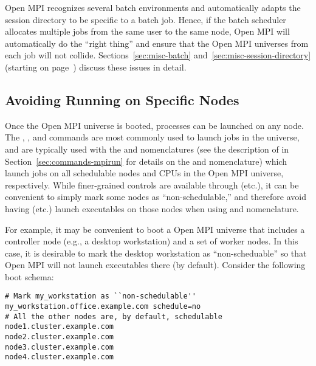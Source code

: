 Open MPI recognizes several batch environments and automatically adapts the
session directory to be specific to a batch job.  Hence, if the batch
scheduler allocates multiple jobs from the same user to the same node,
Open MPI will automatically do the ``right thing'' and ensure that the Open MPI
universes from each job will not collide.
%
Sections~\ref{sec:misc-batch} and~\ref{sec:misc-session-directory}
(starting on page~\pageref{sec:misc-batch}) discuss these issues in
detail.


\subsection{Avoiding Running on Specific Nodes}
\label{sec:commands-lamboot-no-schedule}

Once the Open MPI universe is booted, processes can be launched on any
node.  The , , and  commands are
most commonly used to launch jobs in the universe, and are typically
used with the  and  nomenclatures (see the description of
 in Section~\ref{sec:commands-mpirun} for details on the
 and  nomenclature) which launch jobs on all schedulable
nodes and CPUs in the Open MPI universe, respectively.  While finer-grained
controls are available through  (etc.), it can be
convenient to simply mark some nodes as ``non-schedulable,'' and
therefore avoid having  (etc.) launch executables on those
nodes when using  and  nomenclature.

For example, it may be convenient to boot a Open MPI universe that includes
a controller node (e.g., a desktop workstation) and a set of worker
nodes.  In this case, it is desirable to mark the desktop workstation
as ``non-scheduable'' so that Open MPI will not launch executables there
(by default).  Consider the following boot schema:

\lstset{style=lam-shell}
\begin{lstlisting}
# Mark my_workstation as ``non-schedulable''
my_workstation.office.example.com schedule=no
# All the other nodes are, by default, schedulable
node1.cluster.example.com
node2.cluster.example.com
node3.cluster.example.com
node4.cluster.example.com
\end{lstlisting}

